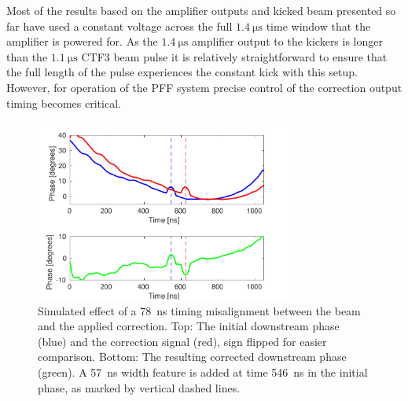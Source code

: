
Most of the results based on the amplifier outputs and kicked beam presented so far have used a constant voltage across the full \(1.4~\mathrm{\mu s}\) time window that the amplifier is powered for. As the \(1.4~\mathrm{\mu s}\) amplifier output to the kickers is longer than the \(1.1~\mathrm{\mu s}\) CTF3 beam pulse it is relatively straightforward to ensure that the full length of the pulse experiences the constant kick with this setup. However, for operation of the PFF system precise control of the correction output timing becomes critical. 

\begin{figure}
  \centering
  \includegraphics[width=0.75\textwidth]{Figures/commissioning/simCorrDelay}
  \caption{Simulated effect of a 78~ns timing misalignment between the beam and the applied correction. Top: The initial downstream phase (blue) and the correction signal (red), sign flipped for easier comparison. Bottom: The resulting corrected downstream phase (green). A 57~ns width feature is added at time 546~ns in the initial phase, as marked by vertical dashed lines. }
  \label{f:simCorrDelay}
\end{figure}


